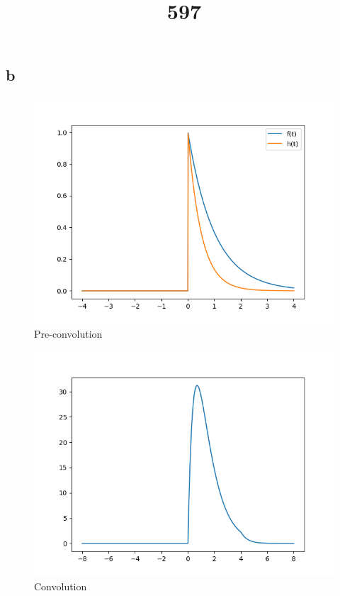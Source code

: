 \documentclass{article}
\begin{document}
\subsection*{b}
\begin{figure}[H]
    \includegraphics[width=\textwidth]{Pre-convolution.png}
    \caption{Pre-convolution}
\end{figure}
\begin{figure}[H]
    \includegraphics[width=\textwidth]{Convolution.png}
    \caption{Convolution}
\end{figure}
\title{597}
\maketitle
\end{document}
